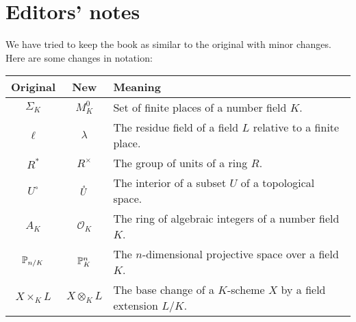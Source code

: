 \chapter*{Editors' notes}
We have tried to keep the book as similar to the original with minor changes.
Here are some changes in notation:
\begin{longtable}{|c|c|p{9cm}|}
	\hline
	\textbf{Original} & \textbf{New} & \textbf{Meaning} \\
	\hline
	\endhead

	\hline
	\endfoot

	$\Sigma_K$ & $M_K^0$ & Set of finite places of a number field $K$. \\
	$\ell$ & $\lambda$ & The residue field of a field $L$ relative to a finite place. \\
	$R^*$ & $R^\times$ & The group of units of a ring $R$. \\
	$U^\circ$ & $\mathring{U}$ & The interior of a subset $U$ of a topological space. \\
	$A_K$ & $\mathcal{O}_K$ & The ring of algebraic integers of a number field $K$. \\
	$\mathbb{P}_{n/K}$ & $\mathbb{P}^n_K$ & The $n$-dimensional projective space over a field $K$. \\
	$X \times_K L$ & $X \otimes_K L$ & The base change of a $K$-scheme $X$ by a field extension $L/K$. \\
\end{longtable}

